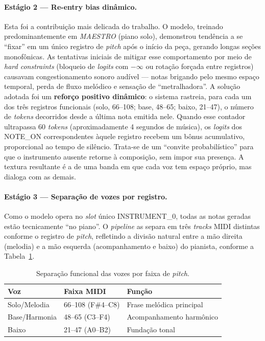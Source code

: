 \documentclass[12pt]{article}
\begin{document}
\paragraph{Estágio 2 --- Re-entry bias dinâmico.} Esta foi a contribuição mais
delicada do trabalho. O modelo, treinado predominantemente em \emph{MAESTRO} (piano
solo), demonstrou tendência a se ``fixar'' em um único registro de \emph{pitch}
após o início da peça, gerando longas seções monofônicas. As tentativas iniciais
de mitigar esse comportamento por meio de \emph{hard constraints} (bloqueio de
\emph{logits} com $-\infty$ ou rotação forçada entre registros) causavam
congestionamento sonoro audível --- notas brigando pelo mesmo espaço temporal,
perda de fluxo melódico e sensação de ``metralhadora''. A solução adotada foi um
\textbf{reforço positivo dinâmico}: o sistema rastreia, para cada um dos três
registros funcionais (solo, 66--108; base, 48--65; baixo, 21--47), o número de
\emph{tokens} decorridos desde a última nota emitida nele. Quando esse contador
ultrapassa 60 \emph{tokens} (aproximadamente 4 segundos de música), os
\emph{logits} dos NOTE\_ON correspondentes àquele registro recebem um bônus
acumulativo, proporcional ao tempo de silêncio. Trata-se de um ``convite
probabilístico'' para que o instrumento ausente retorne à composição, sem impor
sua presença. A textura resultante é a de uma banda em que cada voz tem espaço
próprio, mas dialoga com as demais.

\paragraph{Estágio 3 --- Separação de vozes por registro.} Como o modelo opera no
\emph{slot} único INSTRUMENT\_0, todas as notas geradas estão tecnicamente ``no
piano''. O \emph{pipeline} as separa em três \emph{tracks} MIDI distintas conforme
o registro de \emph{pitch}, refletindo a divisão natural entre a mão direita
(melodia) e a mão esquerda (acompanhamento e baixo) do pianista, conforme a
Tabela~\ref{tab:vozes}.

\begin{table}[ht]
\centering
\caption{Separação funcional das vozes por faixa de \emph{pitch}.}
\label{tab:vozes}
\begin{tabular}{|l|l|l|}
\hline
\textbf{Voz} & \textbf{Faixa MIDI} & \textbf{Função} \\
\hline
Solo/Melodia & 66--108 (F\#4--C8) & Frase melódica principal \\
Base/Harmonia & 48--65 (C3--F4) & Acompanhamento harmônico \\
Baixo & 21--47 (A0--B2) & Fundação tonal \\
\hline
\end{tabular}
\end{table}
\end{document}
